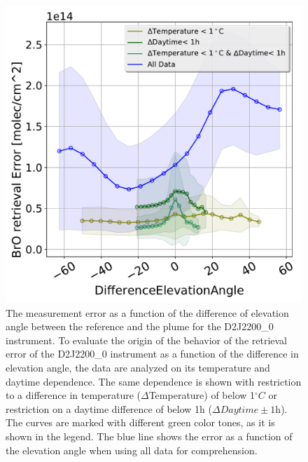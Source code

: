 \begin{figure}[h!]
    \centering
    \includegraphics[width=0.7\linewidth]{Bilder/DiffElevAngleKomischesInstr}
    \caption[The  measurement error as a function of the difference of elevation angle between the reference and the plume for the D2J2200\_0 instrument.]{The  measurement error as a function of the difference of elevation angle between the reference and the plume for the D2J2200\_0 instrument. To evaluate the origin of the behavior of the  retrieval error of the D2J2200\_0 instrument as a function of the difference in elevation angle, the data are analyzed on its temperature and daytime dependence. The same dependence is shown with restriction to a difference in temperature ($\Delta$Temperature) of below 1$^{\circ}C$ or restriction on a daytime difference of below 1h ($\Delta Daytime \pm 1$h). The curves are marked with different green color tones, as it is shown in the legend. The blue line shows the  error as a function of the elevation angle when using all data for comprehension.}
    \label{fig:d2j22000diffelevangleonetempnevad}
\end{figure}


